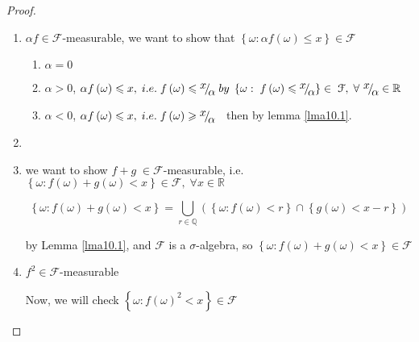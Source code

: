 \begin{proof}
	\text{}
	\begin{enumerate}
		\item $ \alpha f \in \mathcal{F} $-measurable, we want to show that $\left\{ {\omega :\alpha f\left( \omega  \right) \leqslant x} \right\} \in \mathcal{F}$
		\begin{enumerate}
			\item $ \alpha = 0 $
			\item $ \alpha > 0 $, $\alpha f\left( \omega  \right) \leqslant x,\;i.e.\;f\left( \omega  \right) \leqslant {\raise0.7ex\hbox{$x$} \!\mathord{\left/
					{\vphantom {x \alpha }}\right.\kern-\nulldelimiterspace}
				\!\lower0.7ex\hbox{$\alpha $}}\;by\;\left\{ {\omega :\;f\left( \omega  \right) \leqslant {\raise0.7ex\hbox{$x$} \!\mathord{\left/
						{\vphantom {x \alpha }}\right.\kern-\nulldelimiterspace}
					\!\lower0.7ex\hbox{$\alpha $}}} \right\} \in \;\mathcal{F},\;\forall \ {\raise0.7ex\hbox{$x$} \!\mathord{\left/
					{\vphantom {x \alpha }}\right.\kern-\nulldelimiterspace}
				\!\lower0.7ex\hbox{$\alpha $}} \in \mathbb{R}$
			\item $ \alpha < 0 $,  $\alpha f\left( \omega  \right) \leqslant x,\;i.e.\;f\left( \omega  \right) \geqslant {\raise0.7ex\hbox{$x$} \!\mathord{\left/
					{\vphantom {x \alpha }}\right.\kern-\nulldelimiterspace}
				\!\lower0.7ex\hbox{$\alpha $}}\;\;$ then by lemma \ref{lma10.1}. 
		\end{enumerate}
		\item 
		\item  we want to show $f + g\; \in \mathcal{F}$-measurable, i.e. $\left\{ {\omega :f\left( \omega  \right) + g\left( \omega  \right) < x} \right\} \in \mathcal{F},\;\forall x \in \mathbb{R}$
		
		\begin{equation}
		\left\{ {\omega :f\left( \omega  \right) + g\left( \omega  \right) < x} \right\} = \bigcup\limits_{r \in \mathbb{Q}} {\left( {\left\{ {\omega :f\left( \omega  \right) < r} \right\} \cap \left\{ {g\left( \omega  \right) < x - r} \right\}} \right)} 
		\label{eq11.1}
		\end{equation}
		
		by Lemma \ref{lma10.1}, and $ \mathcal{F} $ is a $ \sigma $-algebra, so $\left\{ {\omega :f\left( \omega  \right) + g\left( \omega  \right) < x} \right\} \in \mathcal{F}$
		\item $ f^{2} \in \mathcal{F} $-measurable
		
		Now, we will check $\left\{ {\omega :f{{\left( \omega  \right)}^2} < x} \right\} \in \mathcal{F}$
		

\end{enumerate}
\end{proof}
